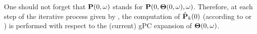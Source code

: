 One should not forget that $\mathbf{P}(0, \omega)$ stands for $\mathbf{P}(0, {\boldsymbol\Theta}(0, \omega), \omega)$. Therefore, at each step of the iterative process given by , the computation of $\hat{\mathbf{P}}_k(0)$ (according to  or ) is performed with respect to the (current) gPC expansion of ${\boldsymbol\Theta}(0, \omega)$.
